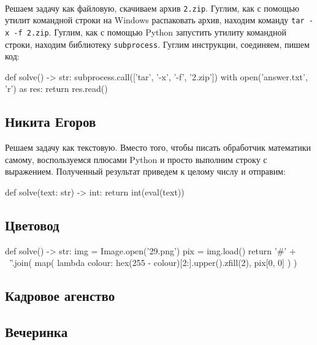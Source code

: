 \documentclass[12pt]{article}
\begin{document}
    \paragraph{}
    Решаем задачу как файловую, скачиваем архив \verb|2.zip|.
    Гуглим, как с помощью утилит командной строки на Windows распаковать архив, находим команду \verb|tar -x -f 2.zip|.
    Гуглим, как с помощью Python запустить утилиту командной строки, находим библиотеку \verb|subprocess|.
    Гуглим инструкции, соединяем, пишем код:
    \begin{pythoncode}
def solve() -> str:
    subprocess.call(['tar',  '-x', '-f',  '2.zip'])
    with open('answer.txt', 'r') as res:
        return res.read()
    \end{pythoncode}

    \subsection{Никита Егоров}
    Решаем задачу как текстовую.
    Вместо того, чтобы писать обработчик математики самому, воспользуемся плюсами Python и просто выполним
    строку с выражением.
    Полученный результат приведем к целому числу и отправим:
    \begin{pythoncode}
def solve(text: str) -> int:
    return int(eval(text))
    \end{pythoncode}


    \subsection{Цветовод}

    \begin{pythoncode}
def solve() -> str:
    img = Image.open('29.png')
    pix = img.load()
    return '#' + \
           ''.join(
               map(
                   lambda colour: hex(255 - colour)[2:].upper().zfill(2),
                   pix[0, 0]
               )
           )
    \end{pythoncode}


    \subsection{Кадровое агенство}


    \subsection{Вечеринка}
\end{document}
